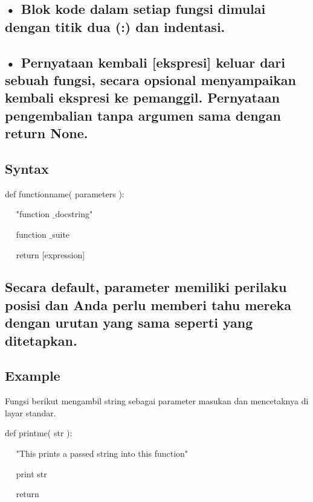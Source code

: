 \documentclass[a4paper,12pt]{report}
\begin{document}
\subsection*{• Blok kode dalam setiap fungsi dimulai dengan titik dua (:) dan indentasi.}
 \par
\subsection*{• Pernyataan kembali [ekspresi] keluar dari sebuah fungsi, secara opsional menyampaikan kembali ekspresi ke pemanggil. Pernyataan pengembalian tanpa argumen sama dengan return None.}
 \par
\vspace{20pt}
\subsection*{Syntax}
 \par
\noindent 
 \hspace*{0.5in} def functionname( parameters ): \par
\noindent 
~~  \hspace*{0.5in}  \hspace*{0.5in} "function $  \_  $docstring" \par
\noindent 
~~  \hspace*{0.5in}  \hspace*{0.5in} function $  \_  $suite \par
\noindent 
~~  \hspace*{0.5in}  \hspace*{0.5in} return [expression] \par
\subsection*{Secara default, parameter memiliki perilaku posisi dan Anda perlu memberi tahu mereka dengan urutan yang sama seperti yang ditetapkan.}
 \par
\vspace{12pt}
\subsection*{Example}
 \par
\begin{adjustwidth}{0.03in}{0.03in}
Fungsi berikut mengambil string sebagai parameter masukan dan mencetaknya di layar standar.\end{adjustwidth}
 \par
\noindent 
 \hspace*{0.5in} def printme( str ): \par
\noindent 
~~  \hspace*{0.5in}  \hspace*{0.5in} "This prints a passed string into this function" \par
\noindent 
~~  \hspace*{0.5in}  \hspace*{0.5in} print str \par
\noindent 
~~  \hspace*{0.5in}  \hspace*{0.5in} return \par
\vspace{20pt}
\end{document}
